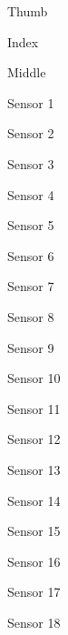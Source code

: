 





Thumb

Index 

Middle


Sensor 1

Sensor 2


Sensor 3


Sensor 4


Sensor 5


Sensor 6


Sensor 7


Sensor 8


Sensor 9


Sensor 10


Sensor 11


Sensor 12

Sensor 13

Sensor 14

Sensor 15

Sensor 16

Sensor 17

Sensor 18








